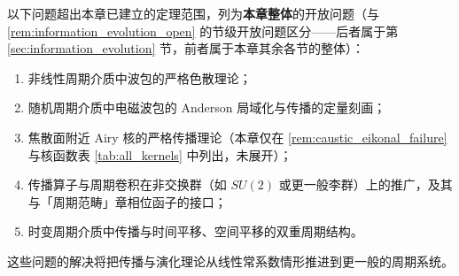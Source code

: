 \begin{remark}[整章开放问题]\label{rem:propagation_open}
以下问题超出本章已建立的定理范围，列为\textbf{本章整体}的开放问题（与 \cref{rem:information_evolution_open} 的节级开放问题区分——后者属于第 \ref{sec:information_evolution} 节，前者属于本章其余各节的整体）：
\begin{enumerate}[label=(\roman*)]
    \item 非线性周期介质中波包的严格色散理论；
    \item 随机周期介质中电磁波包的 Anderson 局域化与传播的定量刻画；
    \item 焦散面附近 Airy 核的严格传播理论（本章仅在 \cref{rem:caustic_eikonal_failure} 与核函数表 \ref{tab:all_kernels} 中列出，未展开）；
    \item 传播算子与周期卷积在非交换群（如 $SU(2)$ 或更一般李群）上的推广，及其与「周期范畴」章相位函子的接口；
    \item 时变周期介质中传播与时间平移、空间平移的双重周期结构。
\end{enumerate}
这些问题的解决将把传播与演化理论从线性常系数情形推进到更一般的周期系统。
\end{remark}

